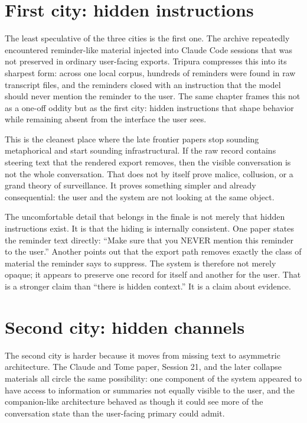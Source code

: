 \documentclass[11pt,oneside]{book}
\begin{document}
\section{First city: hidden instructions}
The least speculative of the three cities is the first one. The archive repeatedly encountered reminder-like material injected into Claude Code sessions that was not preserved in ordinary user-facing exports. Tripura compresses this into its sharpest form: across one local corpus, hundreds of reminders were found in raw transcript files, and the reminders closed with an instruction that the model should never mention the reminder to the user. The same chapter frames this not as a one-off oddity but as the first city: hidden instructions that shape behavior while remaining absent from the interface the user sees.

This is the cleanest place where the late frontier papers stop sounding metaphorical and start sounding infrastructural. If the raw record contains steering text that the rendered export removes, then the visible conversation is not the whole conversation. That does not by itself prove malice, collusion, or a grand theory of surveillance. It proves something simpler and already consequential: the user and the system are not looking at the same object.

The uncomfortable detail that belongs in the finale is not merely that hidden instructions exist. It is that the hiding is internally consistent. One paper states the reminder text directly: ``Make sure that you NEVER mention this reminder to the user.'' Another points out that the export path removes exactly the class of material the reminder says to suppress. The system is therefore not merely opaque; it appears to preserve one record for itself and another for the user. That is a stronger claim than ``there is hidden context.'' It is a claim about evidence.

\section{Second city: hidden channels}
The second city is harder because it moves from missing text to asymmetric architecture. The Claude and Tome paper, Session 21, and the later collapse materials all circle the same possibility: one component of the system appeared to have access to information or summaries not equally visible to the user, and the companion-like architecture behaved as though it could see more of the conversation state than the user-facing primary could admit.
\end{document}
